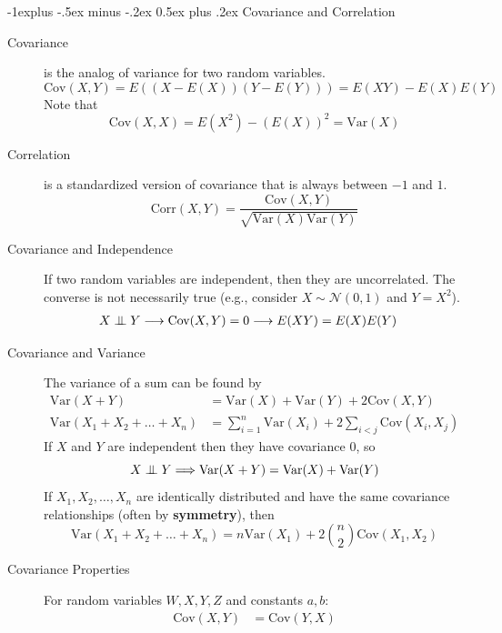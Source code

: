 \documentclass[10pt,landscape]{article}
\makeatletter
\newcommand\independent{\protect\mathpalette{\protect\independenT}{\perp}}
\def\independenT#1#2{\mathrel{\setbox0\hbox{$#1#2$}%
\copy0\kern-\wd0\mkern4mu\box0}}
\newcommand{\var}{\textrm{Var}}
\newcommand{\cov}{\textrm{Cov}}
\newcommand{\corr}{\textrm{Corr}}
\newcommand{\N}{\mathcal{N}}
\renewcommand{\subsection}{\@startsection{subsection}{2}{0mm}%
{-1explus -.5ex minus -.2ex}%
{0.5ex plus .2ex}%
{\normalfont\normalsize\bfseries}}
\makeatother
\begin{document}
\begin{multicols*}{3}
        \subsection{Covariance and Correlation}
        \begin{description}
            \item [Covariance] is the analog of variance for two random variables.
            \[\cov(X, Y) = E\left((X - E(X))(Y - E(Y))\right) = E(XY) - E(X)E(Y)\]
            Note that
            \[\cov(X, X) = E(X^2) - (E(X))^2 =  \var(X)\]
            \item [Correlation] is a standardized version of covariance that is always between $-1$ and $1$.
            \[\corr(X, Y) = \frac{\cov(X, Y)}{\sqrt{\var(X)\var(Y)}} \]
            \item [Covariance and Independence] If two random variables are independent, then they are uncorrelated. The converse is not necessarily true (e.g., consider $X \sim \N(0,1)$ and $Y=X^2$).
            \begin{align*}
                X \independent Y & \longrightarrow \cov(X, Y) = 0 \longrightarrow E(XY) = E(X)E(Y)
            \end{align*}
            \item [Covariance and Variance]  The variance of a sum can be found by
            \begin{align*}
                \var(X + Y)                    & = \var(X) + \var(Y) + 2\cov(X, Y)                          \\
                \var(X_1 + X_2 + \dots + X_n ) & = \sum_{i = 1}^{n}\var(X_i) + 2\sum_{i < j} \cov(X_i, X_j)
            \end{align*}
            If $X$ and $Y$ are independent then they have covariance $0$, so
            \[X \independent Y \Longrightarrow \var(X + Y) = \var(X) + \var(Y)\]
            If $X_1, X_2, \dots, X_n$ are identically distributed and have the same covariance relationships (often by \textbf{symmetry}), then
            \[\var(X_1 + X_2 + \dots + X_n ) = n\var(X_1) + 2{n \choose 2}\cov(X_1, X_2)\]
            \item [Covariance Properties]  For random variables $W, X, Y, Z$ and constants $a, b$:
            \begin{align*}
                \cov(X, Y)         & = \cov(Y, X)                           \\

\end{align*}
\end{description}
\end{multicols*}
\end{document}
